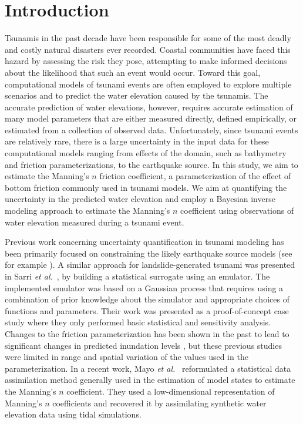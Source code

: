 
\section{Introduction} \label{sec:intro}

Tsunamis in the past decade have been responsible for some of the most  deadly
and costly natural disasters ever recorded. Coastal communities have faced this
hazard by assessing the risk they pose, attempting  to make informed decisions
about the likelihood that such an event would  occur.
Toward this goal, computational models of  tsunami events are often
employed to explore multiple scenarios and to predict the water elevation
caused by the tsunamis. The accurate prediction  of water elevations, however,
requires accurate estimation of many model parameters that are either measured
directly, defined empirically, or estimated from a collection of observed data.
Unfortunately, since tsunami events are relatively rare,  there is a large
uncertainty in the input data for these computational  models ranging from
effects of the domain, such as bathymetry and friction parameterizations,  to
the earthquake source.  In this study, we aim to estimate the Manning's $n$
friction coefficient, a parameterization of the effect of bottom friction 
commonly used in tsunami models.  We aim at quantifying the uncertainty in the 
predicted water elevation  and employ a Bayesian inverse modeling approach to 
estimate the Manning's $n$ coefficient using observations of water elevation 
measured during a tsunami event.

Previous work concerning uncertainty quantification in tsunami modeling has been primarily 
focused on constraining the likely earthquake source models (see
for example \cite{MacInnes:2013cr}).  A similar approach for landslide-generated
tsunami was presented in Sarri \emph{et al.}~\cite{Sarri2012}, by building a statistical surrogate
using an emulator. The implemented emulator was based on a Gaussian
process that requires using a combination of prior knowledge about the simulator
and appropriate choices of functions and parameters. Their work was presented as
a proof-of-concept case study where they only performed basic statistical and
sensitivity analysis.  Changes to the friction parameterization has been shown in 
the past to lead to significant changes in predicted inundation levels \cite{Myers:2001el, 
Jakeman:2010hk}, but these previous studies were limited in range and spatial variation of the values used in the parameterization.  
In a recent work, Mayo \emph{et al.}~\cite{Mayo:2014} reformulated a statistical data assimilation method
generally used in the estimation of model states to estimate the Manning's $n$
coefficient. They used a low-dimensional representation of
Manning's $n$ coefficients and recovered it by assimilating synthetic water elevation data using tidal simulations.

